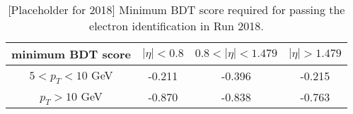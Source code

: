 \begin{table}[h!]
\scriptsize
    \centering
    \begin{tabular}{c|c c c}
\hline %
minimum BDT score    &  $|\eta| < 0.8 $ & $0.8 < |\eta| < 1.479$ 	& $|\eta| > 1.479$      \\
\hline %
$ 5 < p_T < 10 $ GeV &  -0.211      & -0.396  		& -0.215		\\
$p_T > 10$ GeV       &  -0.870		& -0.838		& -0.763		\\
\hline %
\hline %
     \end{tabular}
\small
\caption{[Placeholder for 2018] Minimum BDT score required for passing the electron identification in Run 2018.}
    \label{tab:ele_ID_WP_18}
\end{table}



